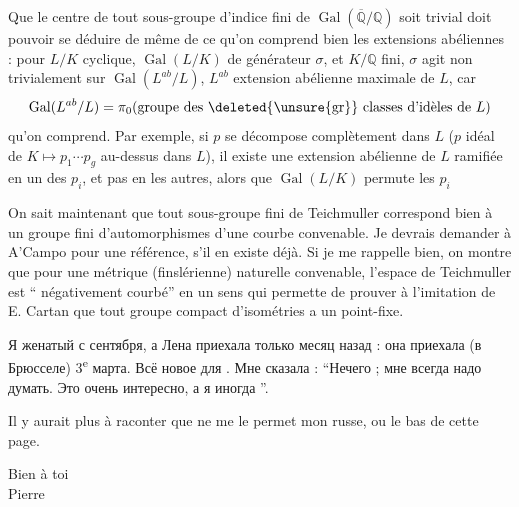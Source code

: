 
Que le centre de tout sous-groupe d'indice fini de $\operatorname{Gal}(\overline{\mathbb Q}/\mathbb Q)$ soit trivial doit pouvoir se déduire de même de ce qu'on comprend bien les extensions abéliennes : pour $L/K$ cyclique, $\operatorname{Gal}(L/K)$ de générateur $\sigma$, et $K/\mathbb Q$ fini, $\sigma$ agit non trivialement sur $\operatorname{Gal}(L^{ab}/L)$, $L^{ab}$ extension abélienne maximale de $L$, car
\[
\operatorname{Gal}(L^{ab}/L)=
\pi_0(\text{groupe des \deleted{\unsure{gr}} classes d'idèles de }L)
\]
qu'on comprend. Par exemple, si $p$ se décompose complètement dans $L$ ($p$ idéal de $K\longmapsto p_1\cdots p_g$ au-dessus dans $L$), il existe une extension abélienne de $L$ ramifiée en un des $p_i$, et pas en les autres, alors que $\operatorname{Gal}(L/K)$ permute les $p_i$

On sait maintenant que tout sous-groupe fini de Teichmuller correspond bien à un groupe fini d'automorphismes d'une courbe convenable. Je devrais demander à A'Campo pour une référence, s'il en existe déjà. Si je me rappelle bien, on montre que pour une métrique (finslérienne)  naturelle convenable, l'espace de Teichmuller est `` négativement courbé'' en un sens qui permette de prouver à l'imitation de E. Cartan que tout groupe compact d'isométries a un point-fixe.


Я женатый с сентября, а Лена приехала только месяц назад : она приехала (в Брюсселе) 3\textsuperscript{e} марта. Всё новое для . Мне сказала : ``Нечего  ; мне всегда надо думать. Это очень интересно, а я иногда ''.

Il y aurait plus à raconter que ne me le permet mon russe, ou le bas de cette page.

\begin{center}
Bien à toi\\
\hfill Pierre
\end{center}

